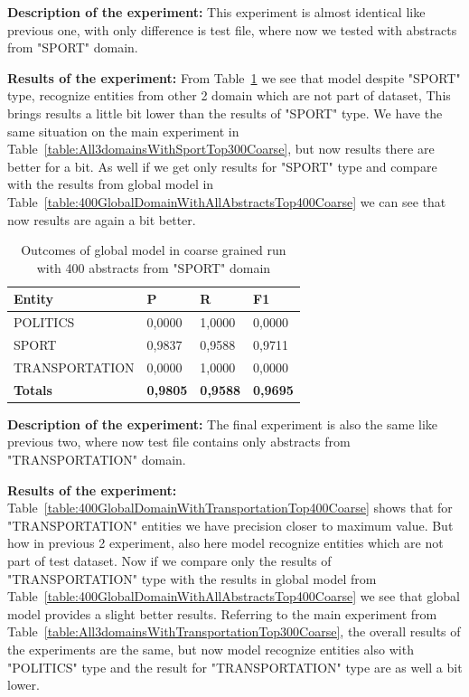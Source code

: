 \documentclass[thesis=M,english]{FITthesis}[2018/05/30]
\begin{document}
\textbf{Description of the experiment:} This experiment is almost identical like previous one, with only difference is test file, where now we tested with abstracts from "SPORT" domain.

\textbf{Results of the experiment:} From Table~\ref{table:400GlobalDomainWithSportTop400Coarse} we see that model despite "SPORT" type, recognize entities from other 2 domain which are not part of dataset, This brings results a little bit lower than the results of "SPORT" type. We have the same situation on the main experiment in Table~\ref{table:All3domainsWithSportTop300Coarse}, but now results there are better for a bit. As well if we get only results for "SPORT" type and compare with the results from global model in Table~\ref{table:400GlobalDomainWithAllAbstractsTop400Coarse} we can see that now results are again a bit better.


	\begin{table}[H]\centering
		\begin{tabular}{|l|l|l|l|}
			\hline {\textbf{Entity}} & {\textbf{P}} & {\textbf{R}} & {\textbf{F1}}\\\hline
				POLITICS & 0,0000 & 1,0000 & 0,0000\\
				SPORT & 0,9837 & 0,9588 & 0,9711\\
				TRANSPORTATION & 0,0000 & 1,0000 & 0,0000\\\hline
				\textbf{Totals} & \textbf{0,9805} & \textbf{0,9588} & \textbf{0,9695}\\\hline
		\end{tabular}
		\caption{Outcomes of global model in coarse grained run with 400 abstracts from "SPORT" domain \label{table:400GlobalDomainWithSportTop400Coarse}}
	\end{table}	

\textbf{Description of the experiment:} The final experiment is also the same like previous two, where now test file contains only abstracts from "TRANSPORTATION" domain.

\textbf{Results of the experiment:} Table~\ref{table:400GlobalDomainWithTransportationTop400Coarse} shows that for "TRANSPORTATION" entities we have precision closer to maximum value. But how in previous 2 experiment, also here model recognize entities which are not part of test dataset. Now if we compare only the results of "TRANSPORTATION" type with the results in global model from Table~\ref{table:400GlobalDomainWithAllAbstractsTop400Coarse} we see that global model provides a slight better results. Referring to the main experiment from Table~\ref{table:All3domainsWithTransportationTop300Coarse}, the overall results of the experiments are the same, but now model recognize entities also with "POLITICS" type and the result for "TRANSPORTATION" type are as well a bit lower.
\end{document}
